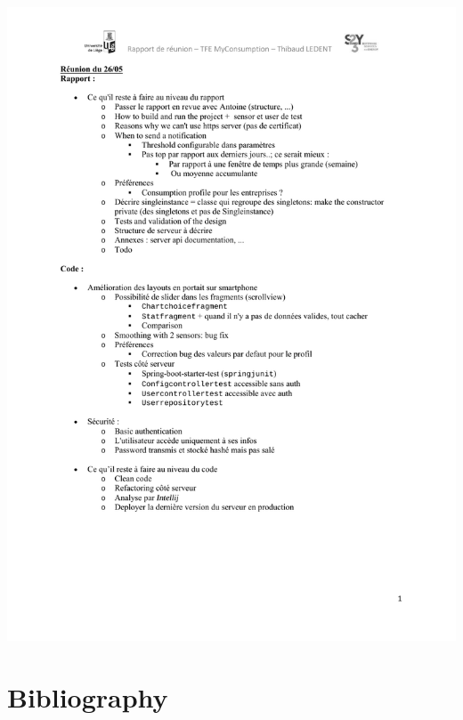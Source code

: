 \documentclass[a4paper, oneside, 11pt]{book}
\newcommand\partcontent{}
\begin{document}
\includegraphics[width=1\textwidth]{reports_NB_Part18.pdf}

\backmatter

\part{Bibliography}
\renewcommand\partcontent{}




\end{document}
